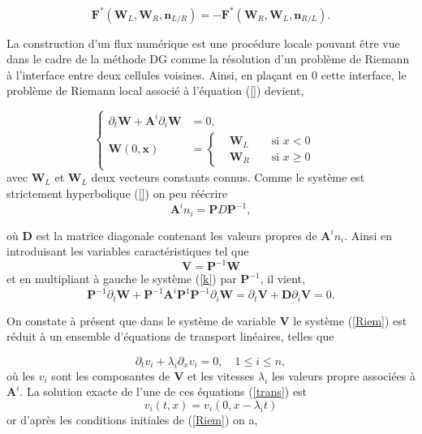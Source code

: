 \documentclass[a4paper,oneside,10pt]{report}
\begin{document}
\begin{equation}
\mathbf{F}^*(\mathbf{W}_L,\mathbf{W}_R,\mathbf{n}_{L/R}) = -\mathbf{F}^*(\mathbf{W}_R,\mathbf{W}_L,\mathbf{n}_{R/L}).
\end{equation}

La construction d'un flux numérique est une procédure locale pouvant être vue dans le cadre de la méthode DG comme la résolution d'un problème de Riemann à l'interface entre deux cellules voisines. Ainsi, en plaçant en $0$ cette interface, le problème de Riemann local associé à l'équation (\ref{}) devient,

\begin{equation}
\label{Riem}
\left\{
\begin{aligned}
\partial_t \mathbf{W} + \mathbf{A}^i \partial_i \mathbf{W} &= 0,\\
\mathbf{W}(0,\mathbf{x}) &= \left\{
\begin{aligned}
&\mathbf{W}_L& &\mbox{ si } x < 0&\\
&\mathbf{W}_R& &\mbox{ si } x \geq 0&
\end{aligned}
\right.
\end{aligned}
\right.
\end{equation}
avec $\mathbf{W}_L$ et $\mathbf{W}_L$ deux vecteurs constants connus. Comme le système est strictement hyperbolique (\ref{}) on peu réécrire 
\begin{equation}
\mathbf{A}^i n_i=\mathbf{P}D\mathbf{P}^{-1},
\end{equation}

où $\mathbf{D}$ est la matrice diagonale contenant les valeurs propres de $\mathbf{A}^i n_i$. Ainsi en introduisant les variables caractéristiques tel que 
\begin{equation}
\mathbf{V} = \mathbf{P}^{-1}\mathbf{W}
\end{equation}
et en multipliant à gauche le système (\ref{k}) par $\mathbf{P}^{-1}$, il vient,
\begin{equation}
\mathbf{P}^{-1} \partial_t \mathbf{W} + \mathbf{P}^{-1} \mathbf{A}^i \mathbf{P}^{1}\mathbf{P}^{-1}   \partial_i \mathbf{W} = \partial_t \mathbf{V} + \mathbf{D} \partial_i \mathbf{V}  = 0.
\end{equation}

On constate à présent que dans le système de variable $\mathbf{V}$ le système (\ref{Riem}) est réduit à un ensemble d'équations de transport linéaires, telles que 

\begin{equation}
\label{trans}
\partial_t v_i + \lambda_i \partial_x v_i = 0, \quad 1\leq i \leq n,
\end{equation}
où les $v_i$ sont les composantes de $\mathbf{V}$ et les vitesses $\lambda_i$ les valeurs propre associées à  $\mathbf{A}^i$.
La solution exacte de l'une de ces équations (\ref{trans}) est 
\begin{equation}
v_i(t,x) = v_i(0, x-\lambda_it)
\end{equation} 
or d'après les conditions initiales de (\ref{Riem}) on a, 
\end{document}
